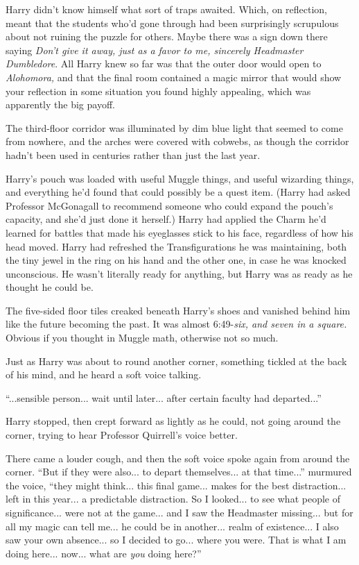 Harry didn't know himself what sort of traps awaited. Which, on reflection, meant that the students who'd gone through had been surprisingly scrupulous about not ruining the puzzle for others. Maybe there was a sign down there saying \emph{Don't give it away, just as a favor to me, sincerely Headmaster Dumbledore}. All Harry knew so far was that the outer door would open to \emph{Alohomora,} and that the final room contained a magic mirror that would show your reflection in some situation you found highly appealing, which was apparently the big payoff.

The third-floor corridor was illuminated by dim blue light that seemed to come from nowhere, and the arches were covered with cobwebs, as though the corridor hadn't been used in centuries rather than just the last year.

Harry's pouch was loaded with useful Muggle things, and useful wizarding things, and everything he'd found that could possibly be a quest item. (Harry had asked Professor McGonagall to recommend someone who could expand the pouch's capacity, and she'd just done it herself.) Harry had applied the Charm he'd learned for battles that made his eyeglasses stick to his face, regardless of how his head moved. Harry had refreshed the Transfigurations he was maintaining, both the tiny jewel in the ring on his hand and the other one, in case he was knocked unconscious. He wasn't literally ready for anything, but Harry was as ready as he thought he could be.

The five-sided floor tiles creaked beneath Harry's shoes and vanished behind him like the future becoming the past. It was almost 6:49-\emph{six, and seven in a square.} Obvious if you thought in Muggle math, otherwise not so much.

Just as Harry was about to round another corner, something tickled at the back of his mind, and he heard a soft voice talking.

``...sensible person... wait until later... after certain faculty had departed...''

Harry stopped, then crept forward as lightly as he could, not going around the corner, trying to hear Professor Quirrell's voice better.

There came a louder cough, and then the soft voice spoke again from around the corner. ``But if they were also... to depart themselves... at that time...'' murmured the voice, ``they might think... this final game... makes for the best distraction... left in this year... a predictable distraction. So I looked... to see what people of significance... were not at the game... and I saw the Headmaster missing... but for all my magic can tell me... he could be in another... realm of existence... I also saw your own absence... so I decided to go... where you were. That is what I am doing here... now... what are \emph{you} doing here?''

